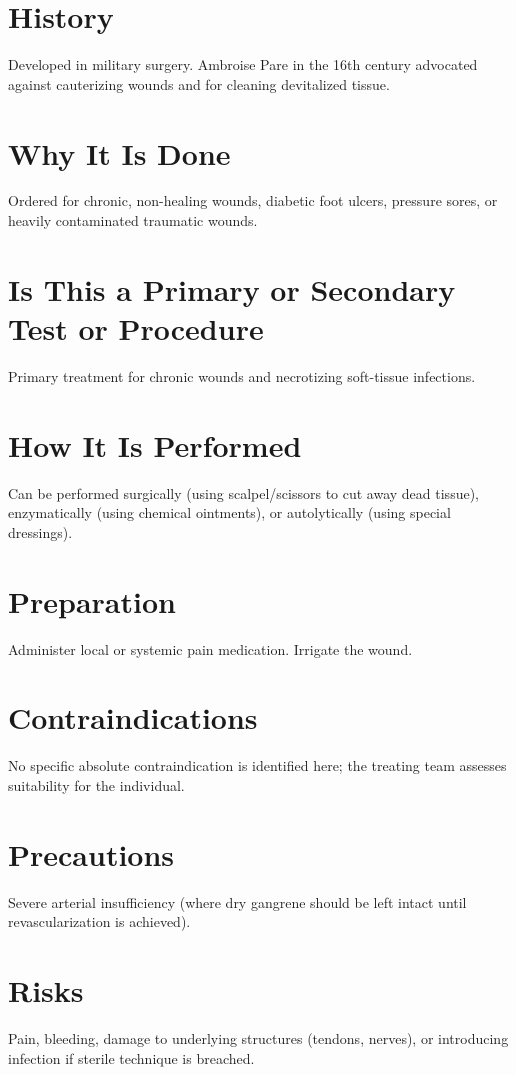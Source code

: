 \section*{History}
Developed in military surgery. Ambroise Pare in the 16th century advocated against cauterizing wounds and for cleaning devitalized tissue.

\section*{Why It Is Done}
Ordered for chronic, non-healing wounds, diabetic foot ulcers, pressure sores, or heavily contaminated traumatic wounds.

\section*{Is This a Primary or Secondary Test or Procedure}
Primary treatment for chronic wounds and necrotizing soft-tissue infections.

\section*{How It Is Performed}
Can be performed surgically (using scalpel/scissors to cut away dead tissue), enzymatically (using chemical ointments), or autolytically (using special dressings).

\section*{Preparation}
Administer local or systemic pain medication. Irrigate the wound.

\section*{Contraindications}
No specific absolute contraindication is identified here; the treating team assesses suitability for the individual.

\section*{Precautions}
Severe arterial insufficiency (where dry gangrene should be left intact until revascularization is achieved).

\section*{Risks}
Pain, bleeding, damage to underlying structures (tendons, nerves), or introducing infection if sterile technique is breached.


